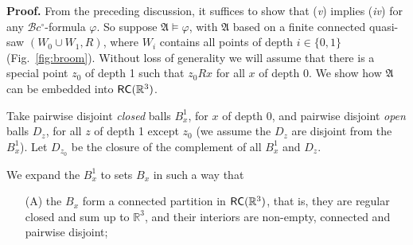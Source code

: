 \documentclass{article}
\newcommand{\cBci}{\ensuremath{\mathcal{B}c^\circ}}
\newcommand{\R}{\mathbb{R}}
\newcommand{\RC}{{\sf RC}}
\newcommand{\qedsymbol}{\ding{113}}
\newenvironment{proof}{\par\noindent\textbf{Proof.}}{\mbox{}\hfill\qedsymbol\par\bigskip}
\renewcommand{\phi}{\varphi}
\begin{document}
\begin{proof}
From the preceding discussion, it suffices to show that ({\em v})
implies ({\em iv}) for any $\cBci$-formula $\phi$. So suppose
$\mathfrak A \models \varphi$, with $\mathfrak A$ based on a finite
connected quasi-saw $(W_0\cup W_1,R)$, where $W_i$ contains all points
of depth $i \in \{0,1\}$ (Fig.~\ref{fig:broom}).  Without loss of
generality we will assume that there is a special point $z_0$ of depth
1 such that $z_0 R x$ for all $x$ of depth 0.  We show how
$\mathfrak{A}$ can be embedded into $\RC(\R^3)$.

Take pairwise disjoint \emph{closed} balls $B^1_x$, for $x$ of depth
0, and pairwise disjoint \emph{open} balls $D_z$, for all $z$ of depth
1 except $z_0$ (we assume the $D_z$ are disjoint from the
$B^1_x$). Let $D_{z_0}$ be the closure of the complement of all
$B_x^1$ and $D_z$.


We expand the $B^1_x$ to sets $B_x$ in such a way that
\begin{itemize}\itemsep=0pt
\item[(A)] the $B_x$ form a connected partition in $\RC(\R^3)$, that
  is, they are regular closed and sum up to $\R^3$, and their
  interiors are non-empty, connected and pairwise disjoint;


\end{itemize}
\end{proof}
\end{document}
